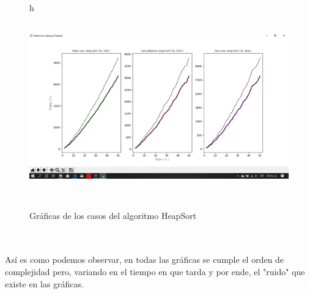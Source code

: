 \documentclass[12pt,twoside]{article}
\begin{document}
\begin{figure}{h}
    \centering
    \includegraphics[width=13cm, height=8cm]{HeapGraph.png}
    \caption{Gr\'aficas de los casos del algoritmo HeapSort}
    \label{fig:quick_program}
\end{figure}
\\\\
Así es como podemos observar, en todas las gr\'aficas se cumple el orden de complejidad pero, variando en el tiempo en que tarda y por ende, el "ruido" que existe en las gr\'aficas.
\end{document}
